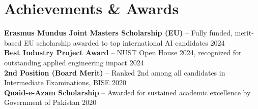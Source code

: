 \documentclass[letterpaper,11pt]{article}
\begin{document}
\section{Achievements \& Awards}
 \begin{itemize}[leftmargin=0.15in, label={}]
    \small{\item{
     \textbf{Erasmus Mundus Joint Masters Scholarship (EU)} -- Fully funded, merit-based EU scholarship awarded to top international AI candidates \hfill 2024 \\
     \textbf{Best Industry Project Award} -- NUST Open House 2024, recognized for outstanding applied engineering impact \hfill 2024 \\
     \textbf{2nd Position (Board Merit)} -- Ranked 2nd among all candidates in Intermediate Examinations, BISE \hfill 2020 \\
     \textbf{Quaid-e-Azam Scholarship} -- Awarded for sustained academic excellence by Government of Pakistan \hfill 2020
    }}
 \end{itemize}


\end{document}
